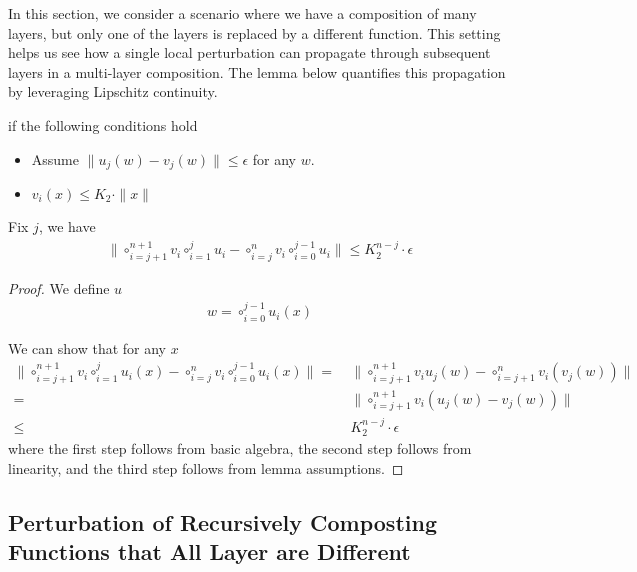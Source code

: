 In this section, we consider a scenario where we have a composition of many layers, but only one of the layers is replaced by a different function. This setting helps us see how a single local perturbation can propagate through subsequent layers in a multi-layer composition. The lemma below quantifies this propagation by leveraging Lipschitz continuity.

\begin{lemma}\label{lem:one_layer_perturbation}
if the following conditions hold
\begin{itemize}
    \item Assume $\|  u_j(w) - v_j(w) \| \leq \epsilon $ for any $w$.
    \item $v_i(x) \leq K_2 \cdot \| x \|$
\end{itemize}
    Fix $j$, we have 
    \begin{align*}
        \| \circ_{i=j+1}^{n+1} v_i  \circ_{i=1}^j u_i - \circ_{i=j}^n v_i  \circ_{i=0}^{j-1} u_i \| \leq K_2^{n-j} \cdot \epsilon
    \end{align*}
\end{lemma}

\begin{proof}
We define $u$
\begin{align*}
    w = \circ_{i=0}^{j-1} u_i (x)
\end{align*}

    We can show that for any $x$
    \begin{align*}
        \| \circ_{i=j+1}^{n+1} v_i  \circ_{i=1}^j u_i (x) - \circ_{i=j}^n v_i  \circ_{i=0}^{j-1} u_i (x) \| 
        = & ~  \| \circ_{i=j+1}^{n+1} v_i  u_j(w) - \circ_{i=j+1}^n v_i  ( v_j(w) ) \| \\
        = & ~ \| \circ_{i=j+1}^{n+1} v_i ( u_j(w) - v_j(w)  ) \| \\
        \leq & ~ K_2^{n-j} \cdot \epsilon
    \end{align*}
    where the first step follows from basic algebra, the second step follows from linearity, and the third step follows from lemma assumptions.
\end{proof}

\subsection{Perturbation of Recursively Composting Functions that All Layer are Different}\label{sec:pertu_recursive_all}

